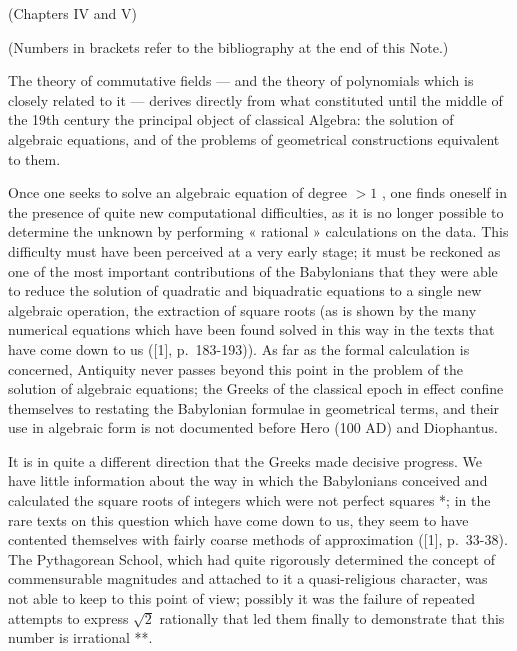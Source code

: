 
(Chapters IV and V)

(Numbers in brackets refer to the bibliography at the end of this Note.)

The theory of commutative fields --- and the theory of polynomials which is closely related to it --- derives directly from what constituted until the middle of the 19th century the principal object of classical Algebra: the solution of algebraic equations, and of the problems of geometrical constructions equivalent to them.

Once one seeks to solve an algebraic equation of degree \(>1\) , one finds oneself in the presence of quite new computational difficulties, as it is no longer possible to determine the unknown by performing « rational » calculations on the data. This difficulty must have been perceived at a very early stage; it must be reckoned as one of the most important contributions of the Babylonians that they were able to reduce the solution of quadratic and biquadratic equations to a single new algebraic operation, the extraction of square roots (as is shown by the many numerical equations which have been found solved in this way in the texts that have come down to us ({[}1{]}, p.~183-193)). As far as the formal calculation is concerned, Antiquity never passes beyond this point in the problem of the solution of algebraic equations; the Greeks of the classical epoch in effect confine themselves to restating the Babylonian formulae in geometrical terms, and their use in algebraic form is not documented before Hero (100 AD) and Diophantus.

It is in quite a different direction that the Greeks made decisive progress. We have little information about the way in which the Babylonians conceived and calculated the square roots of integers which were not perfect squares *; in the rare texts on this question which have come down to us, they seem to have contented themselves with fairly coarse methods of approximation ({[}1{]}, p.~33-38). The Pythagorean School, which had quite rigorously determined the concept of commensurable magnitudes and attached to it a quasi-religious character, was not able to keep to this point of view; possibly it was the failure of repeated attempts to express \(\sqrt{2}\) rationally that led them finally to demonstrate that this number is irrational **.

